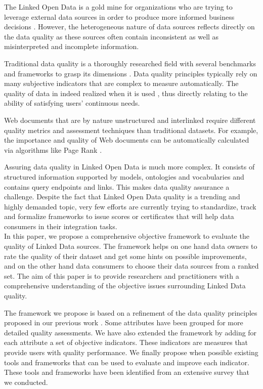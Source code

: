 \documentclass[onecolumn, crcready]{iosart2c}
\begin{document}
The Linked Open Data is a gold mine for organizations who are trying to leverage external data sources in order to produce more informed business decisions \cite{Boyd2011}. However, the heterogeneous nature of data sources reflects directly on the data quality as these sources often contain inconsistent as well as misinterpreted and incomplete information.

Traditional data quality is a thoroughly researched field with several benchmarks and frameworks to grasp its dimensions \cite{Kahn2002}\cite{Stvilia2007}\cite{Wang1996}. Data quality principles typically rely on many subjective indicators that are complex to measure automatically. The quality of data in indeed realized when it is used \cite{juran-j-1999-quality}, thus directly relating to the ability of satisfying users' continuous needs.

Web documents that are by nature unstructured and interlinked require different quality metrics and assessment techniques than traditional datasets. For example, the importance and quality of Web documents can be automatically calculated via algorithms like Page Rank \cite{ Lawrence981}.

Assuring data quality in Linked Open Data is much more complex. It consists of structured information supported by models, ontologies and vocabularies and contains query endpoints and links. This makes data quality assurance a challenge. Despite the fact that Linked Open Data quality is a trending and highly demanded topic, very few efforts are currently trying to standardize, track and formalize frameworks to issue scores or certificates that will help data consumers in their integration tasks.\\

In this paper, we propose a comprehensive objective framework to evaluate the quality of Linked Data sources. The framework helps on one hand data owners to rate the quality of their dataset and get some hints on possible improvements, and on the other hand data consumers to choose their data sources from a ranked set. The aim of this paper is to provide researchers and practitioners with a comprehensive understanding of the objective issues surrounding Linked Data quality.

The framework we propose is based on a refinement of the data quality principles proposed in our previous work \cite{assaf2012}. Some attributes have been grouped for more detailed quality assessments. We have also extended the framework by adding for each attribute a set of objective indicators. These indicators are measures that provide users with quality performance. We finally propose when possible existing tools and frameworks that can be used to evaluate and improve each indicator. These tools and frameworks have been identified from an extensive survey that we conducted.\\
\end{document}
